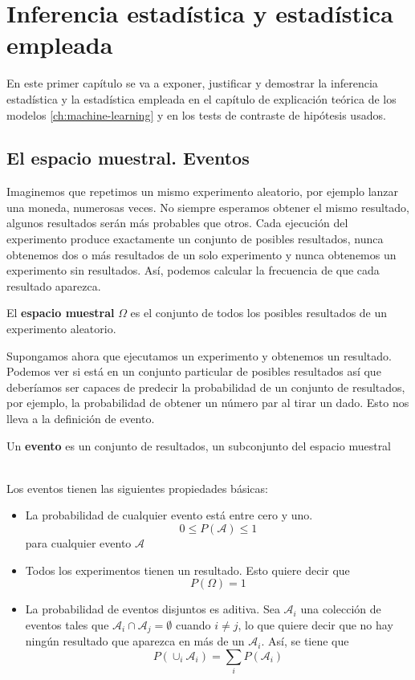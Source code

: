 
\chapter{Inferencia estadística y estadística empleada}
En este primer capítulo se va a exponer, justificar y demostrar la inferencia estadística y la estadística empleada en el capítulo de explicación teórica de los modelos \autoref{ch:machine-learning} y en los tests de contraste de hipótesis usados.\\
\section{El espacio muestral. Eventos}
Imaginemos que repetimos un mismo experimento aleatorio, por ejemplo lanzar una moneda, numerosas veces. No siempre esperamos obtener el mismo resultado, algunos resultados serán más probables que otros. Cada ejecución del experimento produce exactamente un conjunto de posibles resultados, nunca obtenemos dos o más resultados de un solo experimento y nunca obtenemos un experimento sin resultados. Así, podemos calcular la frecuencia de que cada resultado aparezca.
\begin{definicion}
El \textbf{espacio muestral} $\Omega$ es el conjunto de todos los posibles resultados de un experimento aleatorio.
\end{definicion} 
Supongamos ahora que ejecutamos un experimento y obtenemos un resultado. Podemos ver si está en un conjunto particular de posibles resultados así que deberíamos ser capaces de predecir la probabilidad de un conjunto de resultados, por ejemplo, la probabilidad de obtener un número par al tirar un dado. Esto nos lleva a la definición de evento.
\begin{definicion}
Un \textbf{evento} es un conjunto de resultados, un subconjunto del espacio muestral
\end{definicion}
\cite{forsyth2018probability}\\
Los eventos tienen las siguientes propiedades básicas:\\
\begin{itemize}
 \item La probabilidad de cualquier evento está entre cero y uno. \[0 \leq P(\mathcal{A}) \leq 1\] para cualquier evento $\mathcal{A}$
 \item Todos los experimentos tienen un resultado. Esto quiere decir que \[ P(\Omega)=1 \]
 \item La probabilidad de eventos disjuntos es aditiva. Sea $\mathcal{A}_{i}$ una colección de eventos tales que $\mathcal{A}_{i} \cap \mathcal{A}_{j}=\emptyset$ cuando $i \neq j$, lo que quiere decir que no hay ningún resultado que aparezca en más de un $\mathcal{A}_{i}$. Así, se tiene que
\[ P(\cup_{i}\mathcal{A}_{i})= \sum_{i}P(\mathcal{A}_{i}) \]
\end{itemize}

